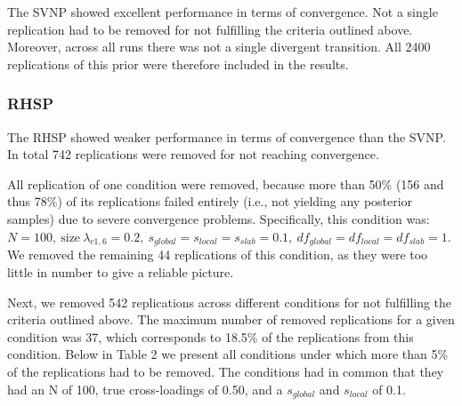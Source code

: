 \documentclass[
  man, donotrepeattitle,floatsintext]{apa6}
\begin{document}
The SVNP showed excellent performance in terms of convergence. Not a single replication had to be removed for not fulfilling the criteria outlined above. Moreover, across all runs there was not a single divergent transition. All 2400 replications of this prior were therefore included in the results.

\hypertarget{rhsp}{%
\subsubsection{RHSP}\label{rhsp}}

The RHSP showed weaker performance in terms of convergence than the SVNP. In total 742 replications were removed for not reaching convergence.

All replication of one condition were removed, because more than 50\% (156 and thus 78\%) of its replications failed entirely (i.e., not yielding any posterior samples) due to severe convergence problems. Specifically, this condition was: \(N = 100, \ \text{size} \ \lambda_{c1,6} = 0.2, \ s_{global} = s_{local} = s_{slab} = 0.1, \ df_{global} = df_{local} = df_{slab} = 1\). We removed the remaining 44 replications of this condition, as they were too little in number to give a reliable picture.

Next, we removed 542 replications across different conditions for not fulfilling the criteria outlined above. The maximum number of removed replications for a given condition was 37, which corresponds to 18.5\% of the replications from this condition. Below in Table 2 we present all conditions under which more than 5\% of the replications had to be removed. The conditions had in common that they had an N of 100, true cross-loadings of 0.50, and a \(s_{global}\) and \(s_{local}\) of 0.1.
\end{document}
